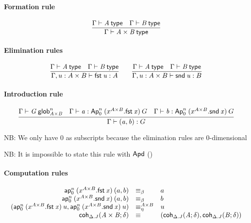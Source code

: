 \paragraph{Formation rule}

\begin{small}
  \[
  \infer{\wftype\Gamma{A\times B}}
  {\wftype\Gamma{A}
    & \wftype\Gamma{B}}
  \]
\end{small}

\paragraph{Elimination rules}

\begin{small}
  \[
  \infer{\ofglob{\Gamma,u:A\times B}{\fst u}{A}}
  {\wftype\Gamma{A}
    & \wftype\Gamma{B}}
  \qquad
  \infer{\ofglob{\Gamma,u:A\times B}{\snd u}{B}}
  {\wftype\Gamma{A}
    & \wftype\Gamma{B}}
  \]
\end{small}

\paragraph{Introduction rule}

\begin{small}
  \[
  \infer{\ofglob{\Gamma}{(a, b)}{G}} {\wfglob{\Gamma}{G}{n}{A\times B} &
    \ofglob{\Gamma}{a}{\Apnm{n}{0}{(x^{A\times{}B}.\fst x)}{G}} &
    \ofglob{\Gamma}{b}{\Apnm{n}{0}{(x^{A\times{}B}.\snd x)}{G}} }
  \]
\end{small}

NB: We only have $0$ as subscripts because the elimination rules are
$0$-dimensional

NB: It is impossible to state this rule with $\mathsf{Apd}$ ()

\paragraph{Computation rules}

\begin{small}
  \[
  \begin{array}{rll}
    \mathsf{ap}^{n}_{0} \: {(x^{A\times{}B}.\mathit{\mathsf{fst} \: x})} \: {(a,b)} & \equiv_\beta & a\\
    \mathsf{ap}^{n}_{0} \: {(x^{A\times{}B}.\mathit{\mathsf{snd} \: x})} \: {(a,b)} & \equiv_\beta & b\\
    (\mathsf{ap}^{n}_{0} \: {(x^{A\times{}B}.\mathit{\mathsf{fst} \: x})} \: {u}, \mathsf{ap}^{n}_{0} \: {(x^{A\times{}B}.\mathit{\mathsf{snd} \: x})} \: {u}) & \equiv^{A\times{}B}_\eta & u\\
    \mathsf{coh}_{\Delta.J} \mathit{(A\times B;\delta)} & \equiv &
    (\mathsf{coh}_{\Delta.J} \mathit{(A;\delta)},\mathsf{coh}_{\Delta.J} \mathit{(B;\delta)})
  \end{array}
  \]
\end{small}

